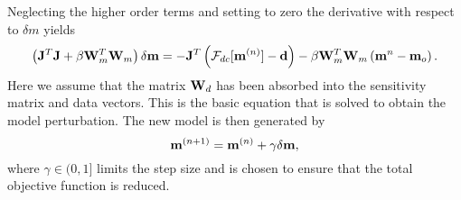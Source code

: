 Neglecting the higher order terms and setting to zero the derivative with respect to $\delta m$ yields
%
\begin{equation}
\label{eq:GN}
\left( \mathbf{J}^T\mathbf{J} + \beta \mathbf{W}_m^T\mathbf{W}_m \right) \delta \mathbf{m} = -\mathbf{J}^T \left( \mathcal{F}_{dc}[\mathbf{m}^{(n)}] - \mathbf{d} \right) - \beta\mathbf{W}_m^T\mathbf{W}_m \left(\mathbf{m}^{n} - \mathbf{m}_o \right).
\end{equation}
Here we assume that the matrix $\mathbf{W}_d$ has been absorbed into the sensitivity matrix and data vectors. This is the basic equation that is solved to obtain the model perturbation. The new model is then generated by
%
\begin{equation}
\mathbf{m}^{(n+1)} = \mathbf{m}^{(n)} + \gamma\delta\mathbf{m},
\end{equation}
where $\gamma \in (0,1]$ limits the step size and is chosen to ensure that the total objective function is reduced.


